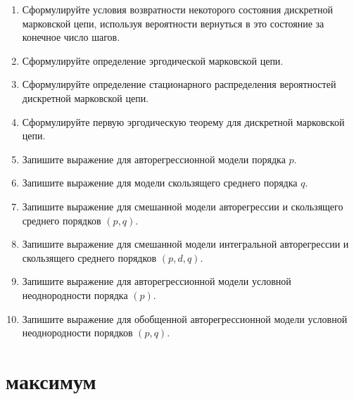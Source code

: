 \documentclass[a4paper,12pt]{extreport}
\renewcommand{\=}[1]{\stackrel{#1}{=}} %
\begin{document}
\begin{enumerate}
	\item Сформулируйте условия возвратности некоторого состояния дискретной марковской цепи,
	используя вероятности вернуться в это состояние за конечное число шагов.

	\item Сформулируйте определение эргодической марковской цепи.
	\item Сформулируйте определение стационарного распределения вероятностей
	дискретной марковской цепи.
	\item Сформулируйте первую эргодическую теорему для дискретной марковской цепи.

	\item Запишите выражение для авторегрессионной модели порядка $p$.
	\item Запишите выражение для модели скользящего среднего порядка $q$.
	\item Запишите выражение для смешанной модели авторегрессии и скользящего среднего порядков $(p, q)$.
	\item Запишите выражение для смешанной модели интегральной авторегрессии
	и скользящего среднего порядков $(p, d, q)$.
	\item Запишите выражение для авторегрессионной модели условной неоднородности порядка $(p)$.
	\item Запишите выражение для обобщенной авторегрессионной модели
	условной неоднородности порядков $(p, q)$.
\end{enumerate}

\newpage

\section*{ максимум}
\end{document}
